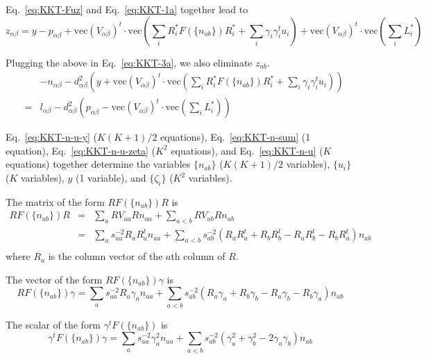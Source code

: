 \documentclass{article}
\newcommand*{\mvec}{\mathbf{\mathrm{vec}}}
\begin{document}
Eq.~\ref{eq:KKT-Fuz} and Eq.~\ref{eq:KKT-1a} together lead to
\begin{equation}
z_{\alpha\beta} = y - p_{\alpha\beta} + \mvec( V_{\alpha\beta})^t\cdot \mvec\left(\sum_i R_i^\ast F(\{ n_{ab}\}) R_i^\ast + \sum_i \gamma_i \gamma_i^t u_i\right) + \mvec(V_{\alpha\beta})^t\cdot \mvec\left(\sum_i L_i^\ast\right)
\end{equation}

Plugging the above in Eq.~\ref{eq:KKT-3a}, we also eliminate $z_{ab}$.
\begin{eqnarray}
&&-n_{\alpha\beta} - d_{\alpha\beta}^2 \left( y + \mvec(V_{\alpha\beta})^t\cdot
\mvec\left(\sum_i R_i^\ast F(\{ n_{ab} \}) R_i^\ast + \sum_i \gamma_i \gamma_i^t u_i\right)\right)
\nonumber \\
&=& l_{\alpha\beta} - d_{\alpha\beta}^2 \left(p_{\alpha\beta} - \mvec( V_{\alpha\beta})^t\cdot
\mvec\left( \sum_i L_i^\ast \right)\right)
\label{eq:KKT-n-u-y}
\end{eqnarray}

Eq.~\ref{eq:KKT-n-u-y} ($K(K+1)/2$ equations), Eq.~\ref{eq:KKT-n-sum}
(1 equation), Eq.~\ref{eq:KKT-n-u-zeta} ($K^2$ equations), and
Eq.~\ref{eq:KKT-n-u} ($K$ equations) together determine the
variables $\{ n_{ab} \}$ ($K(K+1)/2$ variables), $\{ u_i \}$ ($K$
variables), $y$ (1 variable), and $\{ \zeta_i \}$ ($K^2$ variables).

The matrix of the form $ R F(\{ n_{ab} \}) R$ is
\begin{eqnarray}
R F( \{ n_{ab} \}) R &=& \sum_a R V_{aa} R n_{aa} + \sum_{a<b} R V_{ab} R n_{ab}
\nonumber \\
&=& \sum_a s_{aa}^{-2} R_a R_a^t n_{aa} 
 + \sum_{a<b} s_{ab}^{-2} (R_a R_a^t + R_b R_b^t - R_a R_b^t - R_b R_a^t) n_{ab}
\nonumber \\
\end{eqnarray}
where $R_a$ is the column vector of the $a$th column of $R$.

The vector of the form $ R F(\{ n_{ab} \}) \gamma $ is
\begin{equation}
R F( \{ n_{ab} \}) \gamma = \sum_a s_{aa}^{-2} R_a \gamma_a n_{aa}
  + \sum_{a<b} s_{ab}^{-2} ( R_a \gamma_a + R_b \gamma_b - R_a \gamma_b - R_b \gamma_a) n_{ab}
\end{equation}

The scalar of the form $\gamma^t F(\{ n_{ab} \})$ is
\begin{equation}
\gamma^t F(\{ n_{ab} \}) \gamma = \sum_a s_{aa}^{-2} \gamma_a^2 n_{aa}
 + \sum_{a<b} s_{ab}^{-2} ( \gamma_a^2 + \gamma_b^2 - 2\gamma_a\gamma_b ) n_{ab}
\end{equation}
\end{document}
